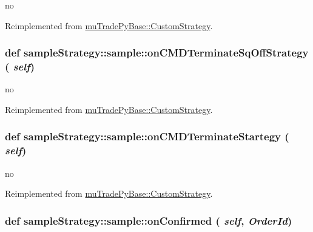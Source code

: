 no 

Reimplemented from \hyperlink{classmuTradePyBase_1_1CustomStrategy_af8fb22d6864e7c61a61f94cf963746e5}{muTradePyBase::CustomStrategy}.\hypertarget{classsampleStrategy_1_1sample_add6cff726b92c0b035ffe094989b5dbb}{
\subsubsection[{onCMDTerminateSqOffStrategy}]{\setlength{\rightskip}{0pt plus 5cm}def sampleStrategy::sample::onCMDTerminateSqOffStrategy ( {\em self})}}
\label{classsampleStrategy_1_1sample_add6cff726b92c0b035ffe094989b5dbb}


no 

Reimplemented from \hyperlink{classmuTradePyBase_1_1CustomStrategy_a8b35516aaa2a7f1940ad86191e022b8e}{muTradePyBase::CustomStrategy}.\hypertarget{classsampleStrategy_1_1sample_aae075263f0648af98b9222b1f099bda0}{
\subsubsection[{onCMDTerminateStartegy}]{\setlength{\rightskip}{0pt plus 5cm}def sampleStrategy::sample::onCMDTerminateStartegy ( {\em self})}}
\label{classsampleStrategy_1_1sample_aae075263f0648af98b9222b1f099bda0}


no 

Reimplemented from \hyperlink{classmuTradePyBase_1_1CustomStrategy_aeb2e0e2196645380512c59f9752efb5e}{muTradePyBase::CustomStrategy}.\hypertarget{classsampleStrategy_1_1sample_a0f8cc6ff13892e5a0c15abc506de2d24}{
\subsubsection[{onConfirmed}]{\setlength{\rightskip}{0pt plus 5cm}def sampleStrategy::sample::onConfirmed ( {\em self}, \/   {\em OrderId})}}
\label{classsampleStrategy_1_1sample_a0f8cc6ff13892e5a0c15abc506de2d24}


